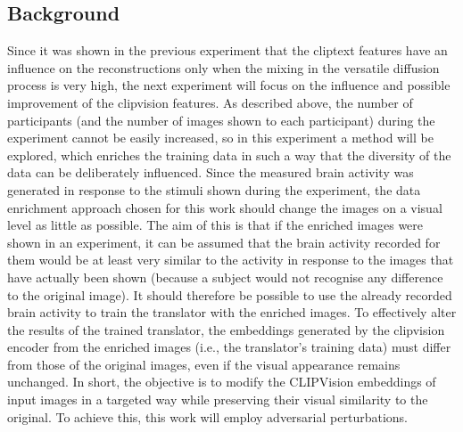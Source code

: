 \subsection{Background}
Since it was shown in the previous experiment that the cliptext features have an influence on the reconstructions only when the mixing in the versatile diffusion process is very high, the next experiment will focus on the influence and possible improvement of the clipvision features. As described above, the number of participants (and the number of images shown to each participant) during the experiment cannot be easily increased, so in this experiment a method will be explored, which enriches the training data in such a way that the diversity of the data can be deliberately influenced. Since the measured brain activity was generated in response to the stimuli shown during the experiment, the data enrichment approach chosen for this work should change the images on a visual level as little as possible. The aim of this is that if the enriched images were shown in an experiment, it can be assumed that the brain activity recorded for them would be at least very similar to the activity in response to the images that have actually been shown (because a subject would not recognise any difference to the original image). It should therefore be possible to use the already recorded brain activity to train the translator with the enriched images. To effectively alter the results of the trained translator, the embeddings generated by the clipvision encoder from the enriched images (i.e., the translator's training data) must differ from those of the original images, even if the visual appearance remains unchanged. In short, the objective is to modify the CLIPVision embeddings of input images in a targeted way while preserving their visual similarity to the original. To achieve this, this work will employ adversarial perturbations\cite{goodfellowExplainingHarnessingAdversarial2014, papernotPracticalBlackBoxAttacks2017, naseerIntriguingPropertiesVision2021}.


